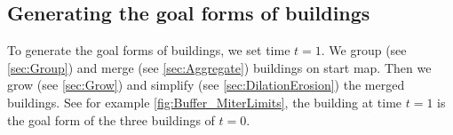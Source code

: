 %
%
%











\subsection{Generating the goal forms of buildings}
\label{sec:Goal}
To generate the goal forms of buildings, we set time $t=1$.
We group (see \sect\ref{sec:Group}) 
and merge (see \sect\ref{sec:Aggregate}) buildings on start map.
Then we grow (see \sect\ref{sec:Grow}) 
and simplify (see \sect\ref{sec:DilationErosion}) the merged buildings.
See for example \fig\ref{fig:Buffer_MiterLimits}, 
the building at time $t=1$ is the goal form of the three buildings of $t=0$.




